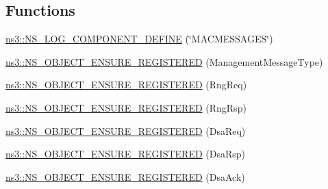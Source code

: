 \subsection*{Functions}
\begin{DoxyCompactItemize}
\item 
\hyperlink{namespacens3_a448b871455e5b7baa9c3298e31eefcd5}{ns3\+::\+N\+S\+\_\+\+L\+O\+G\+\_\+\+C\+O\+M\+P\+O\+N\+E\+N\+T\+\_\+\+D\+E\+F\+I\+NE} (\char`\"{}M\+A\+C\+M\+E\+S\+S\+A\+G\+ES\char`\"{})
\item 
\hyperlink{namespacens3_ad76691220e00418c6c07d85006e7123a}{ns3\+::\+N\+S\+\_\+\+O\+B\+J\+E\+C\+T\+\_\+\+E\+N\+S\+U\+R\+E\+\_\+\+R\+E\+G\+I\+S\+T\+E\+R\+ED} (Management\+Message\+Type)
\item 
\hyperlink{namespacens3_a1d1fffe26e7315088345ae6a78a5e7ff}{ns3\+::\+N\+S\+\_\+\+O\+B\+J\+E\+C\+T\+\_\+\+E\+N\+S\+U\+R\+E\+\_\+\+R\+E\+G\+I\+S\+T\+E\+R\+ED} (Rng\+Req)
\item 
\hyperlink{namespacens3_aa78a48faa7151e30f33583841b3501fe}{ns3\+::\+N\+S\+\_\+\+O\+B\+J\+E\+C\+T\+\_\+\+E\+N\+S\+U\+R\+E\+\_\+\+R\+E\+G\+I\+S\+T\+E\+R\+ED} (Rng\+Rsp)
\item 
\hyperlink{namespacens3_acae8efd11bc00e6f1bf2eab95257049a}{ns3\+::\+N\+S\+\_\+\+O\+B\+J\+E\+C\+T\+\_\+\+E\+N\+S\+U\+R\+E\+\_\+\+R\+E\+G\+I\+S\+T\+E\+R\+ED} (Dsa\+Req)
\item 
\hyperlink{namespacens3_a6d4537488685380a068d1afa17ddc2b9}{ns3\+::\+N\+S\+\_\+\+O\+B\+J\+E\+C\+T\+\_\+\+E\+N\+S\+U\+R\+E\+\_\+\+R\+E\+G\+I\+S\+T\+E\+R\+ED} (Dsa\+Rsp)
\item 
\hyperlink{namespacens3_ae0b55679e54d138cda31a503eb06d05e}{ns3\+::\+N\+S\+\_\+\+O\+B\+J\+E\+C\+T\+\_\+\+E\+N\+S\+U\+R\+E\+\_\+\+R\+E\+G\+I\+S\+T\+E\+R\+ED} (Dsa\+Ack)
\end{DoxyCompactItemize}
